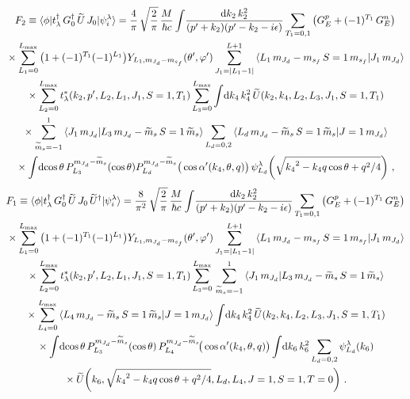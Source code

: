   \begin{multline}
   F_2 \equiv \mbraket{\phi}{t_\lambda ^\dag \, G_0^\dag \, \widetilde{U} \,
   J_0}{\psi_i^\lambda}
   = \frac{4}{\pi} \, \sqrt{\frac{2}{\pi}} \,\frac{M}{\hbar c}
   \int \! \frac{\dd k_2 \, k_2^2}{(\pp + k_2)(\pp - k_2 - i \epsilon)}
   \sum_{T_1 = 0,1} \big(G_E ^p + (-1)^{T_1} \,G_E^n\big) \\
   \null \times
   \sum_{L_1 = 0}^{L_{\rm max}} \big(1 + (-1)^{T_1} (-1)^{L_1}\big)
   Y_{L_1 , \mJd - \msf} (\thetacm, \phicm)
   \sum_{J_1 = |L_1 - 1|}^{L+1}
   \CG{L_1}{\mJd - \msf}{S=1}{\msf}{J_1}{\mJd} \\
   \null \times
   \sum_{L_2 = 0}^{L_{\rm max}}
    t^\ast_\lambda(k_2, \pp, L_2, L_1, J_1, S = 1,T_1)
   \sum_{L_3 = 0}^{L_{\rm max}} \int \! \dd k_4 \, k_4^2 \,
   \widetilde{U}(k_2, k_4, L_2, L_3, J_1, S=1, T_1) \\
   \null \times
   \sum_{\widetilde{m}_s = -1}^1
   \braket{J_1 \, \mJd}{L_3 \, \mJd - \wt{m}_s \, S = 1 \, \wt{m}_s}
   \sum_{L_d = 0, 2}
   \CG{L_d}{\mJd - \widetilde{m}_s}{S=1}{\widetilde{m}_s}{J = 1}{\mJd} \\
   \null \times
   \int \! \dcostheta \, P_{L_3}^{\mJd - \widetilde{m}_s}(\cos \theta)
   P_{L_d}^{\mJd - \widetilde{m}_s} \big(\cos \thetacprime(k_4, \theta, q)\big)
   \, \psi_{L_d}^\lambda\!\left(\sqrt{{k_4}^2 - k_4 q \cos\theta + q^2/4}\right)
   \,,
  \label{eq:F2}
  \end{multline}
  \begin{multline}
   F_1 \equiv \mbraket{\phi}{t_\lambda ^\dag \, G_0^\dag \, \widetilde{U} \,
   J_0 \, \widetilde{U}^\dag}{\psi_i^\lambda}
   = \frac{8}{\pi^2} \, \sqrt{\frac{2}{\pi}} \, \frac{M}{\hbar c}
   \int \! \frac{\dd k_2 \, k_2^2}{(\pp + k_2)(\pp - k_2 - i \epsilon)}
   \sum_{T_1 = 0,1} \big(G_E ^p + (-1)^{T_1} \,G_E^n\big) \\
   \null \times
   \sum_{L_1 = 0}^{L_{\rm max}} \big(1 + (-1)^{T_1} (-1)^{L_1}\big)
   Y_{L_1 , \mJd - \msf} (\thetacm, \phicm)
   \sum_{J_1 = |L_1 - 1|}^{L+1}
    \CG{L_1}{\mJd - \msf}{S=1}{\msf}{J_1}{\mJd} \\
    \null \times
   \sum_{L_2 = 0}^{L_{\rm max}}
    t^\ast_\lambda(k_2, \pp, L_2, L_1, J_1, S=1, T_1)
    \sum_{L_3 = 0}^{L_{\rm max}} \, \sum_{\widetilde{m}_s = -1}^1
    \braket{J_1 \, \mJd}{L_3 \, \mJd - \wt{m}_s \, S= 1 \, \wt{m}_s} \\
   \null \times \sum_{L_4 = 0}^{L_{\rm max}}
    \CG{L_4}{\mJd - \widetilde{m}_s}{S = 1}{\widetilde{m}_s}{J=1}{\mJd}
    \int \! \dd k_4 \, k_4^2 \,
    \widetilde{U}(k_2, k_4, L_2, L_3, J_1, S=1, T_1) \\
    \null \times
   \int \! \dcostheta \, P_{L_3}^{\mJd - \widetilde{m}_s}(\cos \theta) \,
   P_{L_4}^{\mJd - \widetilde{m}_s}\!\big(\cos \thetacprime(k_4, \theta, q)\big)
   \int \! \dd k_6 \, k_6^2
   \sum_{L_d = 0, 2} \psi_{L_d}^\lambda (k_6) \\
   \null \times
   \widetilde{U}\!\left(
    k_6, \sqrt{{k_4}^2 - k_4 q \cos\theta + q^2/4}, L_d, L_4, J=1, S=1, T=0
   \right)  \,.
  \label{eq:F1}
  \end{multline}


